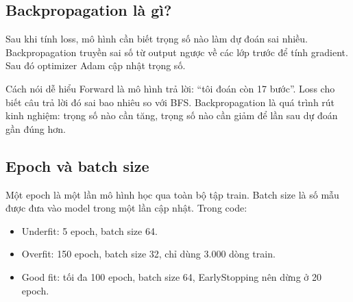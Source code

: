 \documentclass[12pt,a4paper]{article}
\begin{document}
\subsection{Backpropagation là gì?}

Sau khi tính loss, mô hình cần biết trọng số nào làm dự đoán sai nhiều. Backpropagation truyền sai số từ output ngược về các lớp trước để tính gradient. Sau đó optimizer Adam cập nhật trọng số.

\begin{center}
\end{center}

\begin{saybox}{Cách nói dễ hiểu}
Forward là mô hình trả lời: ``tôi đoán còn 17 bước''. Loss cho biết câu trả lời đó sai bao nhiêu so với BFS. Backpropagation là quá trình rút kinh nghiệm: trọng số nào cần tăng, trọng số nào cần giảm để lần sau dự đoán gần đúng hơn.
\end{saybox}

\subsection{Epoch và batch size}

Một epoch là một lần mô hình học qua toàn bộ tập train. Batch size là số mẫu được đưa vào model trong một lần cập nhật. Trong code:

\begin{itemize}
    \item Underfit: 5 epoch, batch size 64.
    \item Overfit: 150 epoch, batch size 32, chỉ dùng 3.000 dòng train.
    \item Good fit: tối đa 100 epoch, batch size 64, EarlyStopping nên dừng ở 20 epoch.
\end{itemize}
\end{document}
